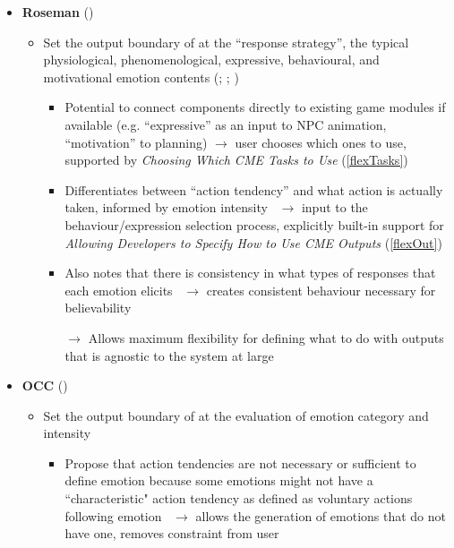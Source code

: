 \begin{itemize}
    \item \textbf{Roseman} (\strong)
    \begin{itemize}
        \item Set the output boundary of \progname{} at the ``response
        strategy'', the typical physiological, phenomenological, expressive,
        behavioural, and motivational emotion contents
        (; ;
        )
        \begin{itemize}
            \item Potential to connect components directly to existing game
            modules if available (e.g. ``expressive'' as an input to NPC
            animation, ``motivation'' to planning) $\rightarrow$ user chooses
            which ones to use, supported by \textit{Choosing Which CME Tasks to
                Use} (\ref{flexTasks})

            \item Differentiates between ``action tendency'' and what action is
            actually taken, informed by emotion
            intensity~\citep[p.~436]{roseman2011emotional} $\rightarrow$ input
            to the behaviour/expression selection process, explicitly built-in
            support for \textit{Allowing Developers to Specify How to Use CME
                Outputs} (\ref{flexOut})

            \item Also notes that there is consistency in what types of
            responses that each emotion elicits~\citep{roseman2011emotional}
            $\rightarrow$ creates consistent behaviour necessary for
            believability~\citep[p.~200]{ortony2002making}

            \item [$\rightarrow$] Allows maximum flexibility for defining what
            to do with outputs that is agnostic to the system at large
        \end{itemize}
    \end{itemize}

    \item \textbf{OCC} (\strong)
    \begin{itemize}
        \item Set the output boundary of \progname{} at the evaluation of
        emotion category and intensity~\citep[p.~19, 69]{occ}
        \begin{itemize}
            \item Propose that action tendencies are not necessary or
            sufficient to define emotion because some emotions might not have a
            ``characteristic" action tendency as defined as voluntary actions
            following emotion~\citep[p.~11]{occ} $\rightarrow$ allows the
            generation of emotions that do not have one, removes constraint
            from user


\end{itemize}
\end{itemize}
\end{itemize}
